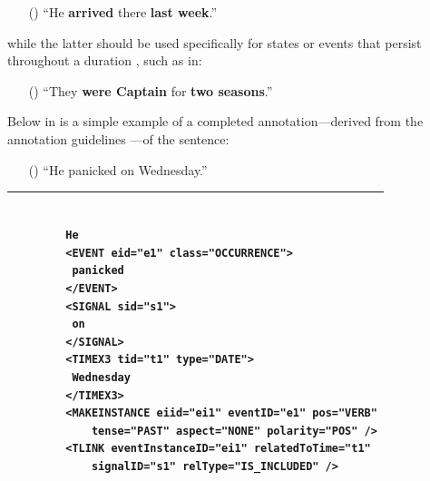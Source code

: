\documentclass[a4paper,12pt,leqno]{article}
\newcommand{\ipp}{(\refstepcounter{equation}\theequation)}
\begin{document}
\begin{itemize}
	\item[\ipp] ``He \textbf{arrived} there \textbf{last week}.''
\end{itemize}
while the latter should be used specifically for states or events that persist throughout a duration \citep[p. 158]{Pustejovsky2005}, such as in:
\begin{itemize}
	\item[\ipp] ``They \textbf{were Captain} for \textbf{two seasons}.''
\end{itemize}
Below in  is a simple example of a completed annotation---derived from the annotation guidelines \citep{sauri2006timeml}---of the sentence:
\begin{itemize}
	\item[\ipp] ``He panicked on Wednesday.''
\end{itemize}
\begin{center}
	\onehalfspacing
	\begin{tabular}[h!]{|l|}
		\hline
		\begin{minipage}{0.75\textwidth}
		\begin{verbatim}

		He
		<EVENT eid="e1" class="OCCURRENCE">
		 panicked
		</EVENT>
		<SIGNAL sid="s1">
		 on
		</SIGNAL>
		<TIMEX3 tid="t1" type="DATE">
		 Wednesday
		</TIMEX3>
		<MAKEINSTANCE eiid="ei1" eventID="e1" pos="VERB"
			tense="PAST" aspect="NONE" polarity="POS" />
		<TLINK eventInstanceID="ei1" relatedToTime="t1"
			signalID="s1" relType="IS_INCLUDED" />

		\end{verbatim}
		\end{minipage}\\
		\hline
	\end{tabular}
	\label{fig:example-timeml-annotation}
\end{center}
\end{document}
